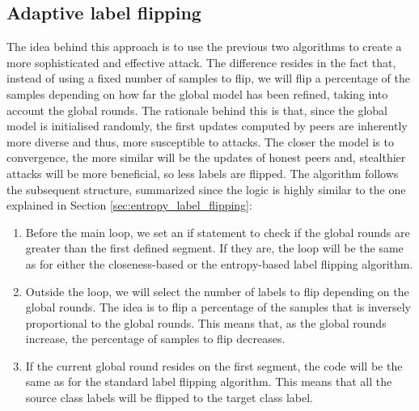 \subsection{Adaptive label flipping}\label{sec:adaptive_label_flipping}
The idea behind this approach is to use the previous two algorithms to create a more sophisticated and effective attack. The difference resides in the fact that, instead of using a fixed number of samples to flip, we will flip a percentage of the samples depending on how far the global model has been refined, taking into account the global rounds. The rationale behind this is that, since the global model is initialised randomly, the first updates computed by peers are inherently more diverse and thus, more susceptible to attacks. The closer the model is to convergence, the more similar will be the updates of honest peers and, stealthier attacks will be more beneficial, so less labels are flipped. The algorithm follows the subsequent structure, summarized since the logic is highly similar to the one explained in Section \ref{sec:entropy_label_flipping}:%
\begin{enumerate}
        \item Before the main loop, we set an if statement to check if the global rounds are greater than the first defined segment. If they are, the loop will be the same as for either the closeness-based or the entropy-based label flipping algorithm. 
        \item Outside the loop, we will select the number of labels to flip depending on the global rounds. The idea is to flip a percentage of the samples that is inversely proportional to the global rounds. This means that, as the global rounds increase, the percentage of samples to flip decreases.
        \item If the current global round resides on the first segment, the code will be the same as for the standard label flipping algorithm. This means that all the source class labels will be flipped to the target class label.
\end{enumerate}



\newpage